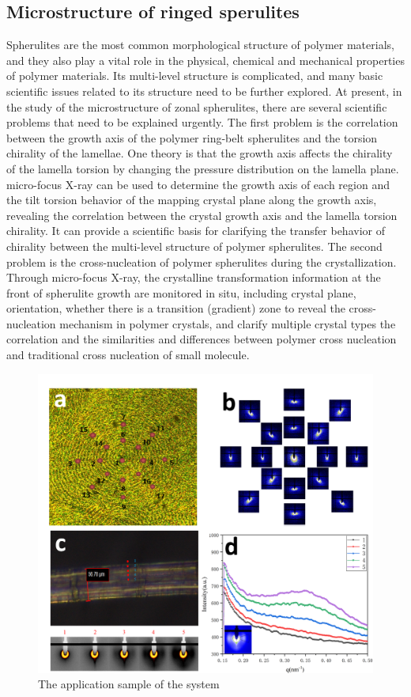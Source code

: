 \documentclass{Head}
\begin{document}
\subsection{Microstructure of ringed sperulites}
Spherulites are the most common morphological structure of polymer materials, and they also play a vital role in the physical, chemical and mechanical properties of polymer materials. Its multi-level structure is complicated, and many basic scientific issues related to its structure need to be further explored.
At present, in the study of the microstructure of zonal spherulites, there are several scientific problems that need to be explained urgently. The first problem is the correlation between the growth axis of the polymer ring-belt spherulites and the torsion chirality of the lamellae.
One theory is that the growth axis affects the chirality of the lamella torsion by changing the pressure distribution on the lamella plane.
micro-focus X-ray can be used to determine the growth axis of each region and the tilt torsion behavior of the mapping crystal plane along the growth axis, revealing the correlation between the crystal growth axis and the lamella torsion chirality. It can provide a scientific basis for clarifying the transfer behavior of chirality between the multi-level structure of polymer spherulites.
The second problem is the cross-nucleation of polymer spherulites during the crystallization.
Through micro-focus X-ray, the crystalline transformation information at the front of spherulite growth are monitored in situ, including crystal plane, orientation, whether there is a transition (gradient) zone to reveal the cross-nucleation mechanism in polymer crystals, and clarify multiple crystal types the correlation and the similarities and differences between polymer cross nucleation and traditional cross nucleation of small molecule.
\begin{figure}
    \centering
    \includegraphics[scale=0.5]{Figures/Fig7AppliedResearch.png}
    \caption{The application sample of the system}
\end{figure}
\end{document}
